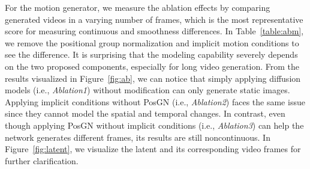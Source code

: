 \documentclass[letterpaper]{article}
\begin{document}
For the motion generator, we measure the ablation effects by comparing generated videos in a varying number of frames, which is the most representative score for measuring continuous and smoothness differences.
In Table~\ref{table:abm}, we remove the positional group normalization and implicit motion conditions to see the difference. It is surprising that the modeling capability severely depends on the two proposed components, especially for long video generation.
From the results visualized in Figure~\ref{fig:ab}, we can notice that simply applying diffusion models (i.e., \emph{Ablation1}) without modification can only generate static images. Applying implicit conditions without PosGN (i.e., \emph{Ablation2}) faces the same issue since they cannot model the spatial and temporal changes. In contrast, even though applying PosGN without implicit conditions (i.e., \emph{Ablation3}) can help the network generates different frames, its results are still noncontinuous.
In Figure~\ref{fig:latent}, we visualize the latent and its corresponding video frames for further clarification.
\end{document}
